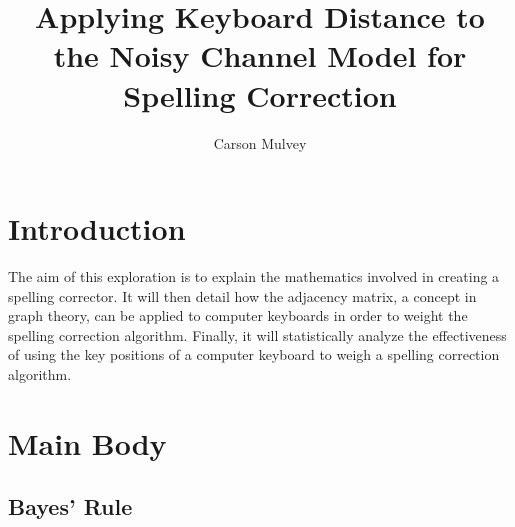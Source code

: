 \documentclass[12pt]{article}
\title{Applying Keyboard Distance to the Noisy Channel Model for Spelling Correction}
\date{Carson Mulvey}
\numberwithin{equation}{section}
\begin{document}
\maketitle

\section{Introduction}

The aim of this exploration is to explain the mathematics involved in creating a spelling corrector. It will then detail how the adjacency matrix, a concept in graph theory, can be applied to computer keyboards in order to weight the spelling correction algorithm. Finally, it will statistically analyze the effectiveness of using the key positions of a computer keyboard to weigh a spelling correction algorithm.

\section{Main Body}

\subsection{Bayes' Rule}
\end{document}
